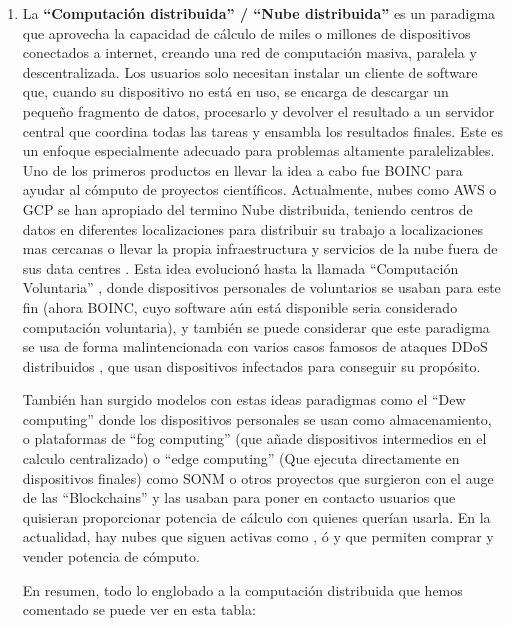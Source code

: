 \begin{enumerate}
	\item La \textbf{``Computación distribuida'' / ``Nube distribuida''} \label{def8} es un paradigma que aprovecha la capacidad de cálculo de miles o millones de dispositivos conectados a internet, creando una red de computación masiva, paralela y descentralizada. Los usuarios solo necesitan instalar un cliente de software que, cuando su dispositivo no está en uso, se encarga de descargar un pequeño fragmento de datos, procesarlo y devolver el resultado a un servidor central que coordina todas las tareas y ensambla los resultados finales. Este es un enfoque especialmente adecuado para problemas altamente paralelizables. Uno de los primeros productos en llevar la idea a cabo fue BOINC \citep{Anderson2004BOINC} para ayudar al cómputo de proyectos científicos. Actualmente, nubes como AWS o GCP se han apropiado del termino Nube distribuida, teniendo centros de datos en diferentes localizaciones para distribuir su trabajo a localizaciones mas cercanas o llevar la propia infraestructura y servicios de la nube fuera de sus data centres \citep{distributedGCP}.
	Esta idea evolucionó hasta la llamada ``Computación Voluntaria'' \citep{Anderson2010Volunteer}, donde dispositivos personales de voluntarios se usaban para este fin (ahora BOINC, cuyo software aún está disponible seria considerado computación voluntaria), y también se puede considerar que este paradigma se usa de forma malintencionada con varios casos famosos de ataques DDoS distribuidos \citep{MydoomDDoSMalware}, \citep{12Botnets} que usan dispositivos infectados para conseguir su propósito.
	
	También han surgido modelos con estas ideas paradigmas como el ``Dew computing'' \citep{DewComputing2018} donde los dispositivos personales se usan como almacenamiento, o plataformas de ``fog computing'' (que añade dispositivos intermedios en el calculo centralizado) o ``edge computing'' (Que ejecuta directamente en dispositivos finales) como SONM \citep{SONMWhitepaper} o otros proyectos \citep{BlockchainBasedDecentralisedCloud2018} que surgieron con el auge de las ``Blockchains'' y las usaban para poner en contacto usuarios que quisieran proporcionar potencia de cálculo con quienes querían usarla. En la actualidad, hay nubes que siguen activas como \citep{GolemNetwork}, \citep{akashCloud} ó \citep{rendernetwork} y que permiten comprar y vender potencia de cómputo.
	
	En resumen, todo lo englobado a la computación distribuida que hemos comentado se puede ver en esta tabla:
	

\end{enumerate}
